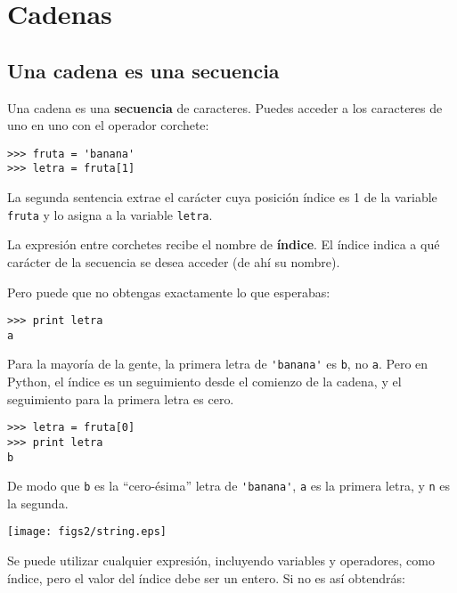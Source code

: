 
\chapter{Cadenas}
\label{strings}


\section{Una cadena es una secuencia}

Una cadena es una {\bf secuencia} de caracteres.
Puedes acceder a los caracteres de uno en uno con el
operador corchete:

\beforeverb
\begin{verbatim}
>>> fruta = 'banana'
>>> letra = fruta[1]
\end{verbatim}
\afterverb
%
La segunda sentencia extrae el carácter cuya posición índice es 1 de la
variable {\tt fruta} y lo asigna a la variable {\tt letra}.

La expresión entre corchetes recibe el nombre de {\bf índice}.
El índice indica a qué carácter de la secuencia se
desea acceder (de ahí su nombre).

Pero puede que no obtengas exactamente lo que esperabas:

\beforeverb
\begin{verbatim}
>>> print letra
a
\end{verbatim}
\afterverb
%
Para la mayoría de la gente, la primera letra de \verb"'banana'" es {\tt b}, no
{\tt a}. Pero en Python, el índice es un seguimiento desde el
comienzo de la cadena, y el seguimiento para la primera letra es cero.

\beforeverb
\begin{verbatim}
>>> letra = fruta[0]
>>> print letra
b
\end{verbatim}
\afterverb
%
De modo que {\tt b} es la ``cero-ésima'' letra de \verb"'banana'", {\tt a}
es la primera letra, y {\tt n} es la segunda.

\beforefig
\centerline{\texttt{[image: figs2/string.eps]}}
\afterfig


Se puede utilizar cualquier expresión, incluyendo variables y operadores, como índice,
pero el valor del índice debe ser un entero. Si no es así
obtendrás:

